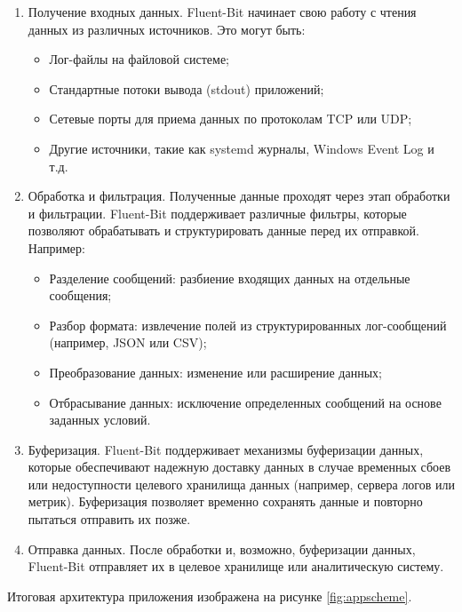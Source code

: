 \documentclass[14pt, russian]{scrartcl}
\begin{document}
\begin{enumerate}
	\item Получение входных данных. Fluent-Bit начинает свою работу с чтения данных из различных источников. Это могут быть:
	      \begin{itemize}
		      \item Лог-файлы на файловой системе;
		      \item Стандартные потоки вывода (stdout) приложений;
		      \item Сетевые порты для приема данных по протоколам TCP или UDP;
		      \item Другие источники, такие как systemd журналы, Windows Event Log и т.д.
	      \end{itemize}

	\item Обработка и фильтрация. Полученные данные проходят через этап обработки и фильтрации. Fluent-Bit поддерживает различные фильтры, которые позволяют обрабатывать и структурировать данные перед их отправкой. Например:
	      \begin{itemize}
		      \item Разделение сообщений: разбиение входящих данных на отдельные сообщения;
		      \item Разбор формата: извлечение полей из структурированных лог-сообщений (например, JSON или CSV);
		      \item Преобразование данных: изменение или расширение данных;
		      \item Отбрасывание данных: исключение определенных сообщений на основе заданных условий.
	      \end{itemize}

	\item Буферизация. Fluent-Bit поддерживает механизмы буферизации данных, которые обеспечивают надежную доставку данных в случае временных сбоев или недоступности целевого хранилища данных (например, сервера логов или метрик). Буферизация позволяет временно сохранять данные и повторно пытаться отправить их позже.

	\item Отправка данных.
	      После обработки и, возможно, буферизации данных, Fluent-Bit отправляет их в целевое хранилище или аналитическую систему.

\end{enumerate}



Итоговая архитектура приложения изображена на рисунке \ref{fig:appscheme}.
\end{document}
